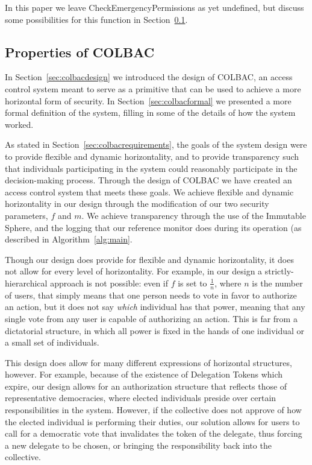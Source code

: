 In this paper we leave CheckEmergencyPermissions as yet undefined, but discuss
some possibilities for this function in Section~\ref{sec:colbacproperties}.

\subsection{Properties of COLBAC}
\label{sec:colbacproperties}
In Section~\ref{sec:colbacdesign} we introduced the design of COLBAC, an access
control system meant to serve as a primitive that can be used to achieve a more
horizontal form of security. In Section~\ref{sec:colbacformal} we presented a
more formal definition of the system, filling in some of the details of how the
system worked.

As stated in Section~\ref{sec:colbacrequirements}, the goals of the system
design were to provide flexible and dynamic horizontality, and to provide
transparency such that individuals participating in the system could reasonably
participate in the decision-making process. Through the design of COLBAC we have
created an access control system that meets these goals. We achieve flexible and
dynamic horizontality in our design through the modification of our two security
parameters, $f$ and $m$. We achieve transparency through the use of the
Immutable Sphere, and the logging that our reference monitor does during its
operation (as described in Algorithm~\ref{alg:main}.

Though our design does provide for flexible and dynamic horizontality, it does
not allow for every level of horizontality. For example, in our design a
strictly-hierarchical approach is not possible: even if $f$ is set to
$\frac{1}{n}$, where $n$ is the number of users, that simply means that one
person needs to vote in favor to authorize an action, but it does not say
\textit{which} individual has that power, meaning that any single vote from any
user is capable of authorizing an action. This is far from a dictatorial
structure, in which all power is fixed in the hands of one individual or a small set of
individuals.

This design does allow for many different expressions of horizontal structures,
however. For example, because of the existence of Delegation Tokens which expire,
our design allows for an authorization structure that reflects those of
representative democracies, where elected individuals preside over certain
responsibilities in the system. However, if the collective does not approve of
how the elected individual is performing their duties, our solution allows for
users to call for a democratic vote that invalidates the token of the delegate,
thus forcing a new delegate to be chosen, or bringing the responsibility back
into the collective.

